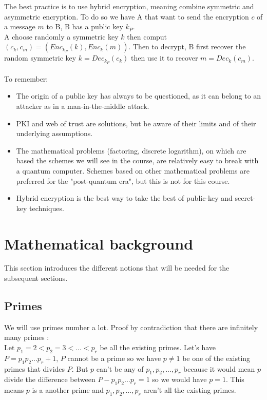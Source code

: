 \documentclass[11pt,a4paper]{report}
\begin{document}
The best practice is to use hybrid encryption, meaning combine symmetric and asymmetric encryption. To do so we have A that want to send the encryption $c$ of a message $m$ to B, B has a public key $k_P$.\\
A choose randomly a symmetric key $k$ then comput $(c_k, c_m) = (Enc_{k_P}(k), Enc_k (m))$. Then to decrypt, B first recover the random symmetric key  $k = Dec_{k_P}(c_k)$ then use it to recover $m = Dec_k (c_m)$.\\
\\
To remember:
\begin{itemize}
\item The origin of a public key has always to be questioned, as it can belong to an attacker as in a man-in-the-middle attack.
\item PKI and web of trust are solutions, but be aware of their limits and of their underlying assumptions.
\item The mathematical problems (factoring, discrete logarithm), on which are based the schemes we will see in the course, are relatively easy to break with a quantum computer. Schemes based on other mathematical problems are preferred for the "post-quantum era", but this is not for this course.
\item Hybrid encryption is the best way to take the best of public-key and secret-key techniques.
\end{itemize}

\section{Mathematical background}
This section introduces the different notions that will be needed for the subsequent sections.\\

\subsection{Primes} 
We will use primes number a lot. Proof by contradiction that there are infinitely many primes :\\
Let $p_1=2 < p_2 = 3 < ... < p_r$ be all the existing primes. Let's have $P = p_1 p_2 ... p_r + 1$, $P$ cannot be a prime so we have $p \neq 1$ be one of the existing primes that divides $P$. But $p$ can't be any of $p_1,p_2,...,p_r$ because it would mean $p$ divide the difference between $P - p_1 p_2...p_r =1$ so we would have $p=1$. This means $p$ is a another prime and $p_1,p_2,...,p_r$ aren't all the existing primes.
\end{document}
